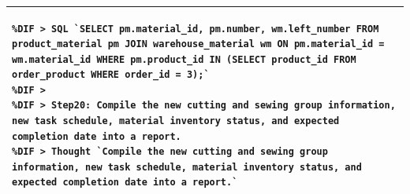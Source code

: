 \documentclass[preprint,12pt]{elsarticle}
\providecommand{\DIFaddend}{} %
\providecommand{\DIFmodend}{} %
\DeclareRobustCommand{\DIFaddend}{\DIFOaddend \let\includegraphics\DIFOincludegraphics} %
\begin{document}
\begin{center}
\begin{longtable}{p{390pt}}
\begin{lstlisting}[style=my_operation, label={lst:chain_of_operation},alsolanguage=DIFcode]
%DIF > Step19: Check material inventory for required materials
%DIF > SQL `SELECT pm.material_id, pm.number, wm.left_number FROM product_material pm JOIN warehouse_material wm ON pm.material_id = wm.material_id WHERE pm.product_id IN (SELECT product_id FROM order_product WHERE order_id = 3);`
%DIF > 
%DIF > Step20: Compile the new cutting and sewing group information, new task schedule, material inventory status, and expected completion date into a report.
%DIF > Thought `Compile the new cutting and sewing group information, new task schedule, material inventory status, and expected completion date into a report.`
\end{lstlisting}
\DIFmodend\\ \hline
\end{longtable}
\end{center}
\DIFaddend 









\end{document}
